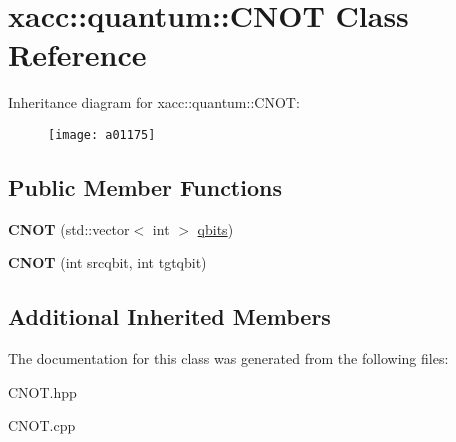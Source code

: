\hypertarget{a01175}{}\section{xacc\+:\+:quantum\+:\+:C\+N\+OT Class Reference}
\label{a01175}
Inheritance diagram for xacc\+:\+:quantum\+:\+:C\+N\+OT\+:\begin{figure}[H]
\begin{center}
\leavevmode
\texttt{[image: a01175]}
\end{center}
\end{figure}
\subsection*{Public Member Functions}
\begin{DoxyCompactItemize}
\item 
\mbox{\label{a01175_ad3d460779a27affa317dd4f3a88268b3}} 
{\bfseries C\+N\+OT} (std\+::vector$<$ int $>$ \hyperlink{a01159_a2a56be6c2519ea65df4d06f4abae1393}{qbits})
\item 
\mbox{\label{a01175_a15efcb44477dde4b6151fe1776a73ddc}} 
{\bfseries C\+N\+OT} (int srcqbit, int tgtqbit)
\end{DoxyCompactItemize}
\subsection*{Additional Inherited Members}


The documentation for this class was generated from the following files\+:\begin{DoxyCompactItemize}
\item 
C\+N\+O\+T.\+hpp\item 
C\+N\+O\+T.\+cpp\end{DoxyCompactItemize}
